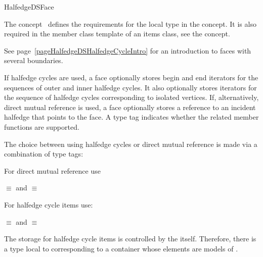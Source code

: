 
\ccRefPageBegin



\begin{ccRefConcept}{HalfedgeDSFace}
\label{pageHalfedgeDSItemsFaceRef}

\ccDefinition
  
The concept \ccRefName\ defines the requirements for the local  
type in the  concept. It is also required in 
the  member class template of an
items class, see the  concept.

See page~\ref{pageHalfedgeDSHalfedgeCycleIntro} for an introduction to faces with several boundaries.

{\XHDS
If halfedge cycles are used, a face optionally stores begin and end iterators for the  sequences
of outer and inner halfedge cycles. It also optionally stores iterators for the sequence of halfedge cycles 
corresponding to isolated vertices.
If, alternatively, direct mutual reference is used, a face optionally stores a reference 
to an incident halfedge that points to the face.
A type tag indicates whether the related member functions are supported. 
}

{\XHDS

The choice between using halfedge cycles or direct mutual reference
is made via a combination of type tags:

For direct mutual reference use

 $\equiv$  
and
 $\equiv$  

For halfedge cycle items use:

 $\equiv$  
and
 $\equiv$  
 
}

\begin{ccAdvanced}
{\XHDS
The storage for halfedge cycle items is controlled by the  itself. Therefore, 
there is a  type local to  corresponding to a 
container whose elements are models of .

}
\end{ccAdvanced}
\end{ccRefConcept}
